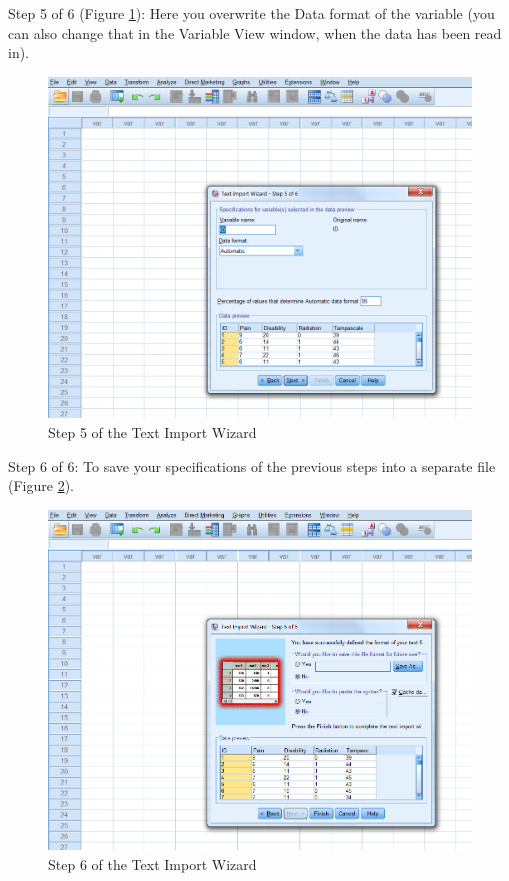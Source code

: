 \documentclass[]{book}
\begin{document}
Step 5 of 6 (Figure \ref{fig:fig23}): Here you overwrite the Data format
of the variable (you can also change that in the Variable View window,
when the data has been read in).

\begin{figure}

{\centering \includegraphics[width=0.95\linewidth]{images/fig1.23} 

}

\caption{Step 5 of the Text Import Wizard}\label{fig:fig23}
\end{figure}

Step 6 of 6: To save your specifications of the previous steps into a
separate file (Figure \ref{fig:fig24}).

\begin{figure}

{\centering \includegraphics[width=0.95\linewidth]{images/fig1.24} 

}

\caption{Step 6 of the Text Import Wizard}\label{fig:fig24}
\end{figure}
\end{document}
